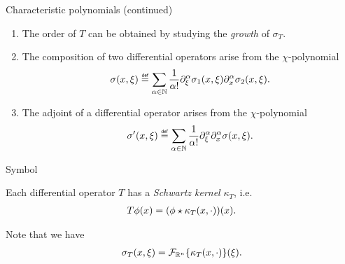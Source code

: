 \documentclass{beamer}
\begin{document}
\begin{frame}
    {Characteristic polynomials (continued)}

    \begin{enumerate}
        \item
            The order of $T$ can be obtained by studying the \emph{growth} of $\sigma_T$.
            \pause
        \item
            The composition of two differential operators arise from the $\chi$-polynomial
            \begin{align}
                \sigma(x, \xi)
                \defeq
                \sum_{\alpha \in \N}
                \frac 1 {\alpha!}
                \iD {\xi^\alpha} \sigma_1(x, \xi)
                \iD {x^\alpha} \sigma_2(x, \xi).
                \label{eq:Euclidean_composition_formula}
            \end{align}
            \pause
        \item
            The adjoint of a differential operator arises from the $\chi$-polynomial
            \begin{align}
                \sigma'(x, \xi)
                \defeq
                \sum_{\alpha \in \N}
                \frac 1 {\alpha!}
                \iD {\xi^\alpha}
                \iD {x^\alpha} \sigma(x, \xi).
                \label{eq:Euclidean_adjunction_formula}
            \end{align}
    \end{enumerate}
\end{frame}

\begin{frame}
    {Symbol}

    Each differential operator $T$ has a \emph{Schwartz kernel} $\kappa_T$, i.e.\
    \begin{align*}
        T \phi(x) = (\phi \star \kappa_T(x, \cdot))(x).
    \end{align*}

    \pause
    Note that we have
    \begin{align*}
        \sigma_T(x, \xi)
        = \mathcal{F}_{\mathbb{R}^n} \{\kappa_T(x, \cdot)\}(\xi).
    \end{align*}
\end{frame}
\end{document}
